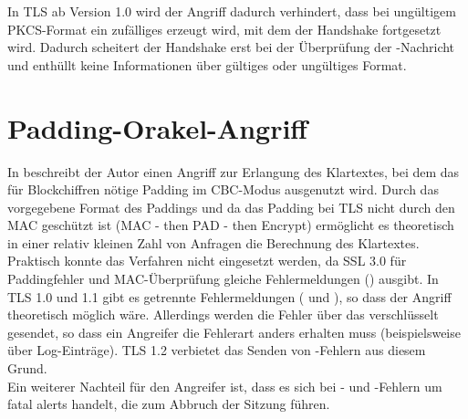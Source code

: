 In TLS ab Version 1.0 wird der Angriff dadurch verhindert, dass bei ungültigem PKCS-Format ein zufälliges \premastersecret{} erzeugt wird, mit dem der Handshake fortgesetzt wird. Dadurch scheitert der Handshake erst bei der Überprüfung der \finished{}-Nachricht und enthüllt keine Informationen über gültiges oder ungültiges Format.

\section{Padding-Orakel-Angriff}
\label{sec_attack_padding_oracle}

In \cite{vaudenay02} beschreibt der Autor einen Angriff zur Erlangung des Klartextes, bei dem das für Blockchiffren nötige Padding im CBC-Modus ausgenutzt wird. Durch das vorgegebene Format des Paddings und da das Padding bei TLS nicht durch den MAC geschützt ist (MAC - then PAD - then Encrypt) ermöglicht es theoretisch in einer relativ kleinen Zahl von Anfragen die Berechnung des Klartextes.\\
Praktisch konnte das Verfahren nicht eingesetzt werden, da SSL 3.0 für Paddingfehler und MAC-Überprüfung gleiche Fehlermeldungen (\badrecordmac{}) ausgibt. In TLS 1.0 und 1.1 gibt es getrennte Fehlermeldungen (\badrecordmac{} und \decryptionfailed{}), so dass der Angriff theoretisch möglich wäre. Allerdings werden die Fehler über das \alertprotocol{} verschlüsselt gesendet, so dass ein Angreifer die Fehlerart anders erhalten muss (beispielsweise über Log-Einträge). TLS 1.2 verbietet das Senden von \decryptionfailed{}-Fehlern aus diesem Grund.\\
Ein weiterer Nachteil für den Angreifer ist, dass es sich bei \badrecordmac{}- und \decryptionfailed{}-Fehlern um fatal alerts handelt, die zum Abbruch der Sitzung führen.

